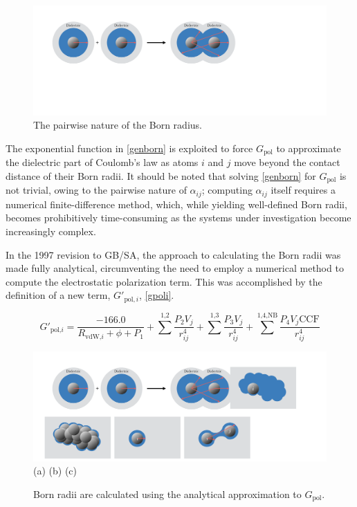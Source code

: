 \documentclass[12pt]{report}
\begin{document}
\vspace*{-0.3cm}
\begin{figure}[ht]
\centering
\includegraphics[scale=0.33]{figures/pdf/bornradius.pdf}
\caption{The pairwise nature of the Born radius.}
\label{bornrad}
\end{figure}
\vspace*{0.2cm}

The exponential function in \cref{genborn} is exploited to force $G_{\textrm{pol}}$ to approximate the dielectric part of Coulomb's law as atoms $i$ and $j$ move beyond the contact distance of their Born radii. It should be noted that solving \cref{genborn} for $G_{\textrm{pol}}$ is not trivial, owing to the pairwise nature of $\alpha_{ij}$; computing $\alpha_{ij}$ itself requires a numerical finite-difference method, which, while yielding well-defined Born radii, becomes prohibitively time-consuming as the systems under investigation become increasingly complex.

In the 1997 revision to GB/SA, \cite{qiu} the approach to calculating the Born radii was made fully analytical, circumventing the need to employ a numerical method to compute the electrostatic polarization term. This was accomplished by the definition of a new term, $G'_{\textrm{pol},i}$, \cref{gpoli}.

\begin{equation}
\label{gpoli}
G'_{\textrm{pol,}i} = \frac{-166.0}{R_{\textrm{vdW,}i}+\phi+P_1}+\sum^{\textrm{1,2}} \frac{P_2 V_j}{r_{ij}^{4}} + \sum^{\textrm{1,3}} \frac{P_3 V_j}{r_{ij}^{4}} + \sum^{\textrm{1,4,NB}} \frac{P_4 V_j \textrm{CCF}}{r_{ij}^{4}}
\end{equation}
\vspace*{-0.1cm}

\begin{figure}[b]
\centering
\includegraphics[scale=0.3]{figures/pdf/gpoli.pdf}\\
(a) \hspace*{4.4cm} (b) \hspace*{4.4cm} (c)
\caption{Born radii are calculated using the analytical approximation to $G_{\textrm{pol}}$.}
\label{figpoli}
\end{figure}
\end{document}
